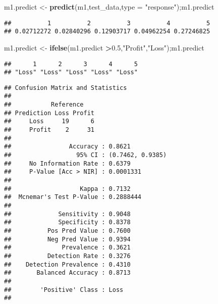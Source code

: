 \documentclass[]{article}
\newenvironment{Shaded}{\begin{snugshade}}{\end{snugshade}}
\newcommand{\KeywordTok}[1]{\textcolor[rgb]{0.13,0.29,0.53}{\textbf{#1}}}
\newcommand{\DataTypeTok}[1]{\textcolor[rgb]{0.13,0.29,0.53}{#1}}
\newcommand{\FloatTok}[1]{\textcolor[rgb]{0.00,0.00,0.81}{#1}}
\newcommand{\StringTok}[1]{\textcolor[rgb]{0.31,0.60,0.02}{#1}}
\newcommand{\CommentTok}[1]{\textcolor[rgb]{0.56,0.35,0.01}{\textit{#1}}}
\newcommand{\OperatorTok}[1]{\textcolor[rgb]{0.81,0.36,0.00}{\textbf{#1}}}
\newcommand{\NormalTok}[1]{#1}
\begin{document}
\begin{Shaded}
\begin{Highlighting}[]
\NormalTok{m1.predict <-}\StringTok{ }\KeywordTok{predict}\NormalTok{(m1,test_data,}\DataTypeTok{type =} \StringTok{"response"}\NormalTok{);m1.predict}
\end{Highlighting}
\end{Shaded}

\begin{verbatim}
##          1          2          3          4          5 
## 0.02712272 0.02840296 0.12903717 0.04962254 0.27246825
\end{verbatim}

\begin{Shaded}
\begin{Highlighting}[]
\NormalTok{m1.predict <-}\StringTok{ }\KeywordTok{ifelse}\NormalTok{(m1.predict }\OperatorTok{>}\FloatTok{0.5}\NormalTok{,}\StringTok{"Profit"}\NormalTok{,}\StringTok{"Loss"}\NormalTok{);m1.predict}
\end{Highlighting}
\end{Shaded}

\begin{verbatim}
##      1      2      3      4      5 
## "Loss" "Loss" "Loss" "Loss" "Loss"
\end{verbatim}

\begin{Shaded}
\end{Shaded}

\begin{verbatim}
## Confusion Matrix and Statistics
## 
##           Reference
## Prediction Loss Profit
##     Loss     19      6
##     Profit    2     31
##                                           
##                Accuracy : 0.8621          
##                  95% CI : (0.7462, 0.9385)
##     No Information Rate : 0.6379          
##     P-Value [Acc > NIR] : 0.0001331       
##                                           
##                   Kappa : 0.7132          
##  Mcnemar's Test P-Value : 0.2888444       
##                                           
##             Sensitivity : 0.9048          
##             Specificity : 0.8378          
##          Pos Pred Value : 0.7600          
##          Neg Pred Value : 0.9394          
##              Prevalence : 0.3621          
##          Detection Rate : 0.3276          
##    Detection Prevalence : 0.4310          
##       Balanced Accuracy : 0.8713          
##                                           
##        'Positive' Class : Loss            
## 
\end{verbatim}
\end{document}

